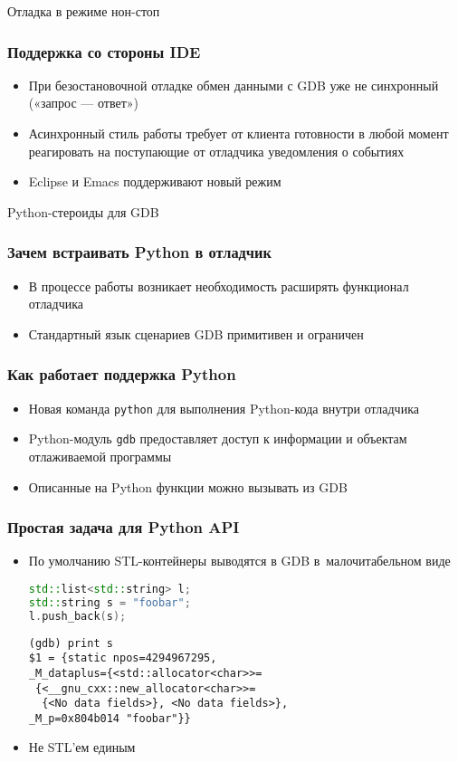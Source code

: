 \documentclass[onlymath]{beamer}
\newcommand\code\texttt
\begin{document}
\begin{subsection}{Отладка в режиме нон-стоп}
\begin{frame}
  \frametitle{Поддержка со стороны IDE}
  \begin{itemize}
  \item При безостановочной отладке обмен данными с GDB уже не
    синхронный («запрос — ответ»)
  \item Асинхронный стиль работы требует от клиента готовности в любой
    момент реагировать на поступающие от отладчика уведомления о
    событиях
  \item Eclipse и Emacs поддерживают новый режим
  \end{itemize}
\end{frame}
\end{subsection}

\begin{subsection}{Python-стероиды для GDB}
\begin{frame}
  \frametitle{Зачем встраивать Python в отладчик}
  \begin{itemize}
  \item В процессе работы возникает необходимость расширять функционал
    отладчика
  \item Стандартный язык сценариев GDB примитивен и ограничен
  \end{itemize}
\end{frame}

\begin{frame}
  \frametitle{Как работает поддержка Python}
  \begin{itemize}
  \item Новая команда \code{python} для выполнения Python-кода внутри
    отладчика
  \item Python-модуль \code{gdb} предоставляет доступ к информации и
    объектам отлаживаемой программы
  \item Описанные на Python функции можно вызывать из GDB
  \end{itemize}
\end{frame}

\begin{frame}[fragile]
  \frametitle{Простая задача для Python API}
  \begin{itemize}
  \item По умолчанию STL-контейнеры выводятся в GDB в малочитабельном
    виде
\begin{lstlisting}[language=C++]
std::list<std::string> l;
std::string s = "foobar";
l.push_back(s);
\end{lstlisting}
\begin{lstlisting}[language=gdb,frameround=tttt]
(gdb) print s
$1 = {static npos=4294967295, 
_M_dataplus={<std::allocator<char>>= 
 {<__gnu_cxx::new_allocator<char>>=
  {<No data fields>}, <No data fields>},
_M_p=0x804b014 "foobar"}}
\end{lstlisting}
\item Не STL’ем единым
  \end{itemize}
\end{frame}


\end{subsection}
\end{document}

